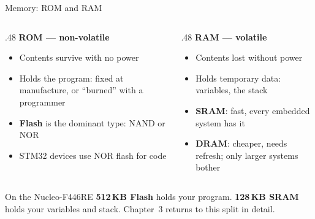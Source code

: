 \documentclass[9pt,aspectratio=169,xcolor=table]{beamer}
\begin{document}
\begin{frame}{Memory: ROM and RAM}
    \begin{columns}[T]
    \begin{column}{.48\textwidth}
        \textbf{ROM --- non-volatile}
        \begin{itemize}\itemsep1pt
            \item Contents survive with \alert{no power}
            \item Holds the program: fixed at manufacture, or
                  ``burned'' with a programmer
            \item \textbf{Flash} is the dominant type: NAND or NOR
            \item STM32 devices use \alert{NOR flash} for code
        \end{itemize}
    \end{column}
    \begin{column}{.48\textwidth}
        \textbf{RAM --- volatile}
        \begin{itemize}\itemsep1pt
            \item Contents \alert{lost} without power
            \item Holds temporary data: variables, the stack
            \item \textbf{SRAM}: fast, every embedded system has it
            \item \textbf{DRAM}: cheaper, needs refresh; only larger
                  systems bother
        \end{itemize}
    \end{column}
    \end{columns}

    \vspace{3mm}
    \begin{block}{On the Nucleo-F446RE}
        \textbf{512\,KB Flash} holds your program. \textbf{128\,KB
        SRAM} holds your variables and stack. Chapter~3 returns to
        this split in detail.
    \end{block}
\end{frame}
\end{document}
